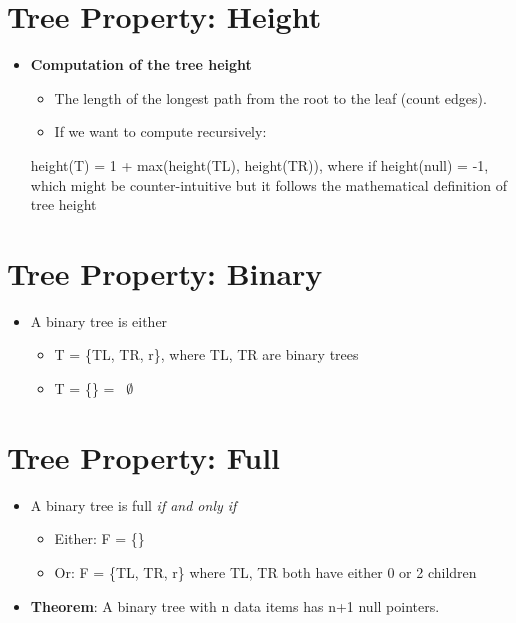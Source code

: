 \documentclass[
]{book}
\providecommand{\tightlist}{%
  \setlength{\itemsep}{0pt}\setlength{\parskip}{0pt}}
\begin{document}
\hypertarget{tree-property-height}{%
\section{Tree Property: Height}\label{tree-property-height}}

\begin{itemize}
\tightlist
\item
  \textbf{Computation of the tree height}

  \begin{itemize}
  \tightlist
  \item
    The length of the longest path from the root to the leaf (count edges).
  \item
    If we want to compute recursively:
  \end{itemize}

  height(T) = 1 + max(height(TL), height(TR)), where if height(null) = -1, which might be counter-intuitive but it follows the mathematical definition of tree height
\end{itemize}

\hypertarget{tree-property-binary}{%
\section{Tree Property: Binary}\label{tree-property-binary}}

\begin{itemize}
\tightlist
\item
  A binary tree is either

  \begin{itemize}
  \tightlist
  \item
    T = \{TL, TR, r\}, where TL, TR are binary trees
  \item
    T = \{\} = ~\(\emptyset\)
  \end{itemize}
\end{itemize}

\hypertarget{tree-property-full}{%
\section{Tree Property: Full}\label{tree-property-full}}

\begin{itemize}
\tightlist
\item
  A binary tree is full \emph{if and only if}

  \begin{itemize}
  \tightlist
  \item
    Either: F = \{\}
  \item
    Or: F = \{TL, TR, r\} where TL, TR both have either 0 or 2 children
  \end{itemize}
\item
  \textbf{Theorem}: A binary tree with n data items has n+1 null pointers.
\end{itemize}
\end{document}
